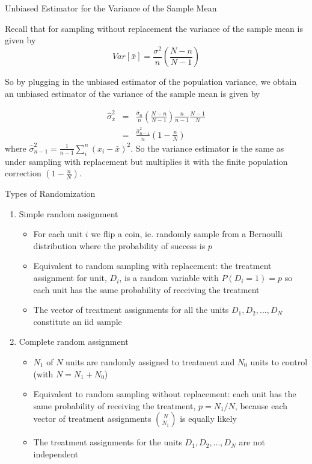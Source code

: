\documentclass{beamer}
\numberwithin{equation}{section}
\begin{document}
\begin{frame}{Unbiased Estimator for the Variance of the Sample Mean}

\scriptsize

\begin{theorem}
Recall that for sampling without replacement the variance of the sample mean is given by
$$
Var[\bar{x}]=\frac{\sigma^2}{n} \left( \frac{N-n}{N-1} \right)
$$

So by plugging in the unbiased estimator of the population variance, we obtain an unbiased estimator of the variance of the sample mean is given by

\begin{eqnarray}
\hat{\sigma}^2_{\bar{x}}&=& \frac{\hat{\sigma}_n}{n}    \left( \frac{N-n}{N-1} \right) \frac{n}{n-1} \frac{N-1}{N}   \\
  &=& \frac{\hat{\sigma}_{n-1}^2}{n} \left( 1- \frac{n}{N}\right) 
\end{eqnarray}
where $\hat{\sigma}_{n-1}^2 = \frac{1}{n-1}   \sum_i^n (x_i-\bar{x})^2$. So the variance estimator is the same as under sampling with replacement but multiplies it with the finite population correction $\left( 1- \frac{n}{N}\right)$.
\end{theorem}
\end{frame}


\begin{frame}{Types of Randomization}

\small

\begin{enumerate}
\item Simple random assignment
\begin{itemize}
\item For each unit $i$ we flip a coin, ie. randomly sample from a Bernoulli distribution where the probability of success is $p$
\item Equivalent to random sampling with replacement: the treatment assignment for unit, $D_i$, is a random variable with $P(D_i=1)=p$ so each unit has the same probability of receiving the treatment
\item The vector of treatment assignments for all the units $D_1,D_2,...,D_N$ constitute an iid sample
\end{itemize}
\item Complete random assignment

\begin{itemize}
\item $N_1$ of $N$ units are randomly assigned to treatment and $N_0$ units to control (with $N= N_1 + N_0$)
\item Equivalent to random sampling without replacement: each unit has the same probability of receiving the treatment, $p=N_1/N$, because each vector of treatment assignments $N \choose N_1$ is equally likely
\item The treatment assignments for the units $D_1,D_2,...,D_N$ are not independent 
\end{itemize}
\end{enumerate}

\end{frame}
\end{document}
